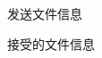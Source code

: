 \documentclass[UTF8,titlepage]{ctexart}
\numberwithin{figure}{section}
\begin{document}
\begin{figure}[H]
\centering
 \caption{发送文件信息}
 \label{}
\end{figure}

\begin{figure}[H]
\centering
 \caption{接受的文件信息}   
 \label{}
\end{figure}
\end{document}
